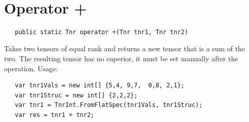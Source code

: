 

\cfoot{\thepage}								      %
\renewcommand{\headrulewidth}{0.0cm}			%
\renewcommand{\footrulewidth}{0.0cm}			%
\lstset{language=[Sharp]C,basicstyle=\small\sffamily}



\begin{center}
   \textbf{\LARGE{}}\\[0.25cm]
\end{center}

\section{Operator +}

\begin{lstlisting}
   public static Tnr operator +(Tnr tnr1, Tnr tnr2)
\end{lstlisting}

Takes two tensors of equal rank and returns a new tensor that is a sum of the two. The resulting tensor has no superior, it must be set manually after the operation. Usage:
\begin{lstlisting}
   var tnr1Vals = new int[] {5,4, 9,7,  0,8, 2,1};
   var tnr1Struc = new int[] {2,2,2};
   var tnr1 = TnrInt.FromFlatSpec(tnr1Vals, tnr1Struc);
   var res = tnr1 + tnr2;
\end{lstlisting}

